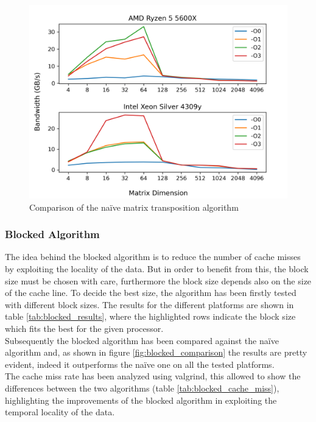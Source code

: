 \documentclass{article}
\begin{document}
\begin{figure}[H]
    \centering
    \includegraphics[scale=0.8]{report/img/naive_comparison.png}
    \caption{Comparison of the na\"{i}ve matrix transposition algorithm}
    \label{fig:naive_comparison}
\end{figure}
\subsubsection{Blocked Algorithm}
The idea behind the blocked algorithm is to reduce the number of cache misses by exploiting the locality of the data. But in order to benefit from this, the block
size must be chosen with care, furthermore the block size depends also on the size of the cache line. To decide the best size, the algorithm has been firstly
tested with different block sizes. The results for the different platforms are shown in table \ref{tab:blocked_results}, where the highlighted rows indicate the 
block size which fits the best for the given processor. \\
Subsequently the blocked algorithm has been compared against the na\"{i}ve algorithm and, as shown in figure \ref{fig:blocked_comparison} the results are pretty evident, indeed
it outperforms the na\"{i}ve one on all the tested platforms. \\
The cache miss rate has been analyzed using valgrind, this allowed to show the differences between the two algorithms (table \ref{tab:blocked_cache_miss}), highlighting
the improvements of the blocked algorithm in exploiting the temporal locality of the data. \\
\end{document}
